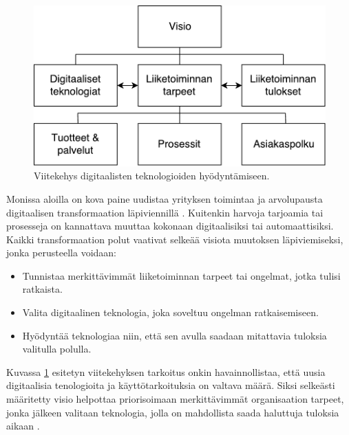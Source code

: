 \documentclass[finnish,12pt,a4paper,pdftex]{article}
\begin{document}
\begin{figure}[!h]
    \centering
    \includegraphics[scale=0.6]{images/digitaalinenvisio.pdf}
    \caption{Viitekehys digitaalisten teknologioiden hyödyntämiseen. \citep{lamoureux}}
    \label{fig:digivisio}
\end{figure}

Monissa aloilla on kova paine uudistaa yrityksen toimintaa ja arvolupausta digitaalisen transformaation läpiviennillä \citep{ibmtrans}. Kuitenkin harvoja tarjoamia tai prosesseja on kannattava muuttaa kokonaan digitaalisiksi tai automaattisiksi. Kaikki transformaation polut vaativat selkeää visiota muutoksen läpiviemiseksi, jonka perusteella voidaan: 

\begin{itemize}
\setlength{\itemsep}{0pt}
    \item Tunnistaa merkittävimmät liiketoiminnan tarpeet tai ongelmat, jotka tulisi ratkaista.
    \item Valita digitaalinen teknologia, joka soveltuu ongelman ratkaisemiseen.
    \item Hyödyntää teknologiaa niin, että sen avulla saadaan mitattavia tuloksia valitulla polulla.
\end{itemize}

Kuvassa \ref{fig:digivisio} esitetyn viitekehyksen tarkoitus onkin havainnollistaa, että uusia digitaalisia tenologioita ja käyttötarkoituksia on valtava määrä. Siksi selkeästi määritetty visio helpottaa priorisoimaan merkittävimmät organisaation tarpeet, jonka jälkeen valitaan teknologia, jolla on mahdollista saada haluttuja tuloksia aikaan \citep{ibmtrans}.

\end{document}
